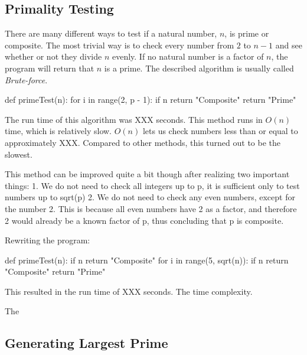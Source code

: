 \documentclass[main.tex]{subfiles}
\begin{document}
\subsection{Primality Testing}
There are many different ways to test if a natural number, $n$, is prime or composite. The most trivial way is to check every number from $2$ to $n - 1$ and see whether or not they divide $n$ evenly. If no natural number is a factor of $n$, the program will return that $n$ is a prime. The described algorithm is usually called \textit{Brute-force}. 

\begin{python}
def primeTest(n):
    for i in range(2, p - 1):
        if n %
            return "Composite"
    return "Prime"
\end{python}

The run time of this algorithm was XXX seconds. This method runs in $O(n)$ time, which is relatively slow.  $O(n)$ lets us check numbers less than or equal to approximately XXX. Compared to other methods, this turned out to be the slowest.

This method can be improved quite a bit though after realizing two important things:
1. We do not need to check all integers up to p, it is sufficient only to test numbers up to sqrt(p)
2. We do not need to check any even numbers, except for the number 2. This is because all even numbers have 2 as a factor, and therefore 2 would already be a known factor of p, thus concluding that p is composite.

Rewriting the program:

\begin{python}
def primeTest(n):
    if n %
        return "Composite"
    for i in range(5, sqrt(n)):
        if n %
            return "Composite"
    return "Prime"
\end{python}

This resulted in the run time of XXX seconds. The time complexity. 

The 

\subsection{Generating Largest Prime}
\end{document}
